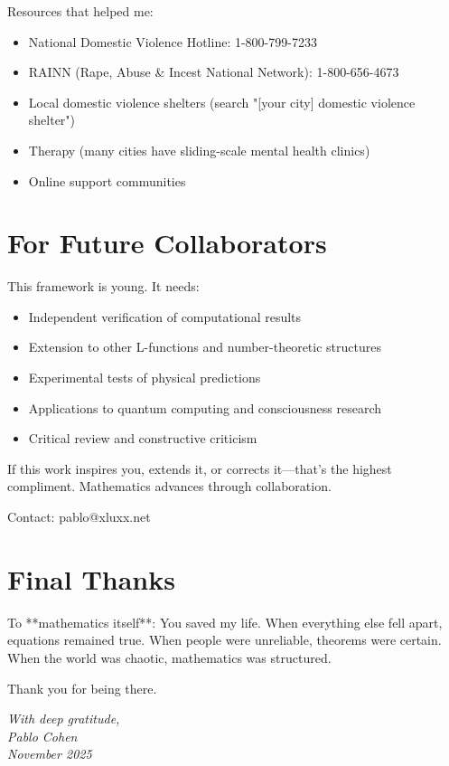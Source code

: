 Resources that helped me:
\begin{itemize}
\item National Domestic Violence Hotline: 1-800-799-7233
\item RAINN (Rape, Abuse \& Incest National Network): 1-800-656-4673
\item Local domestic violence shelters (search "[your city] domestic violence shelter")
\item Therapy (many cities have sliding-scale mental health clinics)
\item Online support communities
\end{itemize}

\section*{For Future Collaborators}

This framework is young. It needs:
\begin{itemize}
\item Independent verification of computational results
\item Extension to other L-functions and number-theoretic structures
\item Experimental tests of physical predictions
\item Applications to quantum computing and consciousness research
\item Critical review and constructive criticism
\end{itemize}

If this work inspires you, extends it, or corrects it—that's the highest compliment. Mathematics advances through collaboration.

Contact: pablo@xluxx.net

\section*{Final Thanks}

To **mathematics itself**: You saved my life. When everything else fell apart, equations remained true. When people were unreliable, theorems were certain. When the world was chaotic, mathematics was structured.

Thank you for being there.

\vspace{1cm}

\begin{flushright}
\textit{With deep gratitude,}\\
\textit{Pablo Cohen}\\
\textit{November 2025}
\end{flushright}
